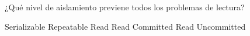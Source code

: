 \question[1] ¿Qué nivel de aislamiento previene todos los problemas de lectura?
\begin{choices}
\CorrectChoice Serializable
\choice Repeatable Read
\choice Read Committed
\choice Read Uncommitted
\end{choices}